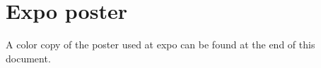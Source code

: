 \section{Expo poster}

A color copy of the poster used at expo can be found at the end of this document.

\begin{figure}[p]
    \vspace*{-2.3cm}
\end{figure}
